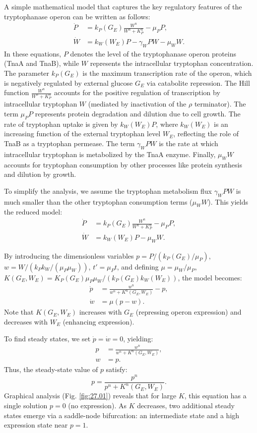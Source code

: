 A simple mathematical model that captures the key regulatory features of the tryptophanase operon can be written as follows:
\begin{align*}
\dot{P}&=k_P(G_E) \frac{W^n}{W^n+K_P^n}-\mu_P P, \\
\dot{W}&=k_W(W_E) P-\gamma_W P W-\mu_W W.
\end{align*}
In these equations, $P$ denotes the level of the tryptophanase operon proteins (TnaA and TnaB), while $W$ represents the intracellular tryptophan concentration. The parameter $k_P(G_E)$ is the maximum transcription rate of the operon, which is negatively regulated by external glucose $G_E$ via catabolite repression. The Hill function $\frac{W^n}{W^n+K_P^n}$ accounts for the positive regulation of transcription by intracellular tryptophan $W$ (mediated by inactivation of the $\rho$ terminator). The term $\mu_P P$ represents protein degradation and dilution due to cell growth. The rate of tryptophan uptake is given by $k_W(W_E) P$, where $k_W(W_E)$ is an increasing function of the external tryptophan level $W_E$, reflecting the role of TnaB as a tryptophan permease. The term $\gamma_W P W$ is the rate at which intracellular tryptophan is metabolized by the TnaA enzyme. Finally, $\mu_W W$ accounts for tryptophan consumption by other processes like protein synthesis and dilution by growth.

To simplify the analysis, we assume the tryptophan metabolism flux $\gamma_W P W$ is much smaller than the other tryptophan consumption terms ($\mu_W W$). This yields the reduced model:
\begin{align*}
\dot{P}&=k_P(G_E) \frac{W^n}{W^n+K_P^n}-\mu_P P, \\
\dot{W}&=k_W(W_E) P -\mu_W W.
\end{align*}

By introducing the dimensionless variables $p = P/\left(k_P(G_E)/\mu_P\right)$, $w = W/\left(k_P k_W/(\mu_P \mu_W)\right)$, $t' = \mu_P t$, and defining $\mu = \mu_W/\mu_P$, $K(G_E,W_E) = K_P(G_E) \mu_P\mu_W/(k_P(G_E) k_W(W_E))$, the model becomes:
\begin{align}
\dot{p}&=\frac{w^n}{w^n+K^n(G_E,W_E)}-p, \label{eq:27.12} \\
\dot{w}&=\mu\left( p - w \right). \label{eq:27.13}
\end{align}
Note that $K(G_E,W_E)$ increases with $G_E$ (repressing operon expression) and decreases with $W_E$ (enhancing expression).

To find steady states, we set $\dot{p}=\dot{w}=0$, yielding:
\begin{align*}
p&=\frac{w^n}{w^n+K^n(G_E,W_E)},\\
w&=p.
\end{align*}
Thus, the steady-state value of $p$ satisfy:
\begin{equation*}
p = \frac{p^n}{p^n + K^n(G_E,W_E)}.
\end{equation*}
Graphical analysis (Fig. \ref{fig:27.01}) reveals that for large $K$, this equation has a single solution $p=0$ (no expression). As $K$ decreases, two additional steady states emerge via a saddle-node bifurcation: an intermediate state and a high expression state near $p=1$.

